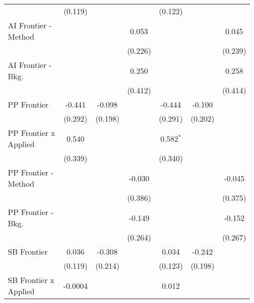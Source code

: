 \begin{tabular}{lcccccc}
                                & (0.119)        &               &                & (0.122)        &              &   \\   
   AI Frontier - Method         &                &               & 0.053          &                &              & 0.045\\   
                                &                &               & (0.226)        &                &              & (0.239)\\   
   AI Frontier - Bkg.           &                &               & 0.250          &                &              & 0.258\\   
                                &                &               & (0.412)        &                &              & (0.414)\\   
   PP Frontier                  & -0.441         & -0.098        &                & -0.444         & -0.100       &   \\   
                                & (0.292)        & (0.198)       &                & (0.291)        & (0.202)      &   \\   
   PP Frontier x Applied        & 0.540          &               &                & 0.582$^{*}$    &              &   \\   
                                & (0.339)        &               &                & (0.340)        &              &   \\   
   PP Frontier - Method         &                &               & -0.030         &                &              & -0.045\\   
                                &                &               & (0.386)        &                &              & (0.375)\\   
   PP Frontier - Bkg.           &                &               & -0.149         &                &              & -0.152\\   
                                &                &               & (0.264)        &                &              & (0.267)\\   
   SB Frontier                  & 0.036          & -0.308        &                & 0.034          & -0.242       &   \\   
                                & (0.119)        & (0.214)       &                & (0.123)        & (0.198)      &   \\   
   SB Frontier x Applied        & -0.0004        &               &                & 0.012          &              &   \\   

\end{tabular}
